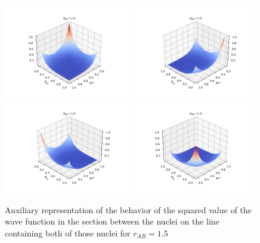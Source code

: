 \documentclass{pracalicmgr}
\begin{document}
\begin{figure}[H]
    \center
    \includegraphics[width=0.49\textwidth]{1.5 (2).pdf}
    \includegraphics[width=0.49\textwidth]{1.5 (3).pdf}
    \includegraphics[width=0.49\textwidth]{1.5 (1).pdf}
    \includegraphics[width=0.49\textwidth]{1.5 (4).pdf}
    \caption{
        Auxiliary representation of the behavior of the squared value of the wave function in the section between the nuclei on the line containing both of those nuclei for $r_{AB} = 1.5$}
    \label{wave 1.5}
\end{figure}
\end{document}
